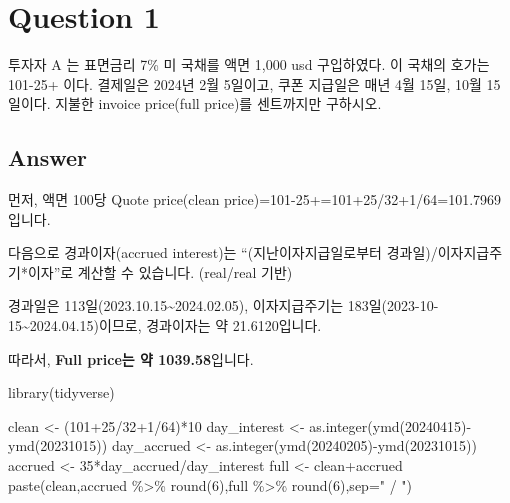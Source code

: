 \documentclass[
  letterpaper,
  DIV=11,
  numbers=noendperiod]{scrreprt}
\newenvironment{Shaded}{\begin{snugshade}}{\end{snugshade}}
\newcommand{\AttributeTok}[1]{\textcolor[rgb]{0.40,0.45,0.13}{#1}}
\newcommand{\DecValTok}[1]{\textcolor[rgb]{0.68,0.00,0.00}{#1}}
\newcommand{\FunctionTok}[1]{\textcolor[rgb]{0.28,0.35,0.67}{#1}}
\newcommand{\NormalTok}[1]{\textcolor[rgb]{0.00,0.23,0.31}{#1}}
\newcommand{\OtherTok}[1]{\textcolor[rgb]{0.00,0.23,0.31}{#1}}
\newcommand{\SpecialCharTok}[1]{\textcolor[rgb]{0.37,0.37,0.37}{#1}}
\newcommand{\StringTok}[1]{\textcolor[rgb]{0.13,0.47,0.30}{#1}}
\begin{document}

\section*{Question 1}\label{question-1}


투자자 A 는 표면금리 7\% 미 국채를 액면 1,000 usd 구입하였다. 이 국채의
호가는 101-25+ 이다. 결제일은 2024년 2월 5일이고, 쿠폰 지급일은 매년 4월
15일, 10월 15일이다. 지불한 invoice price(full price)를 센트까지만
구하시오.

\subsection*{Answer}\label{answer}

먼저, 액면 100당 Quote price(clean
price)=101-25+=101+25/32+1/64=101.7969입니다.

다음으로 경과이자(accrued interest)는 ``(지난이자지급일로부터
경과일)/이자지급주기*이자''로 계산할 수 있습니다. (real/real 기반)

경과일은 113일(2023.10.15\textasciitilde2024.02.05), 이자지급주기는
183일(2023-10-15\textasciitilde2024.04.15)이므로, 경과이자는 약
21.6120입니다.

따라서, \textbf{Full price는 약 1039.58}입니다.

\begin{Shaded}
\begin{Highlighting}[]
\FunctionTok{library}\NormalTok{(tidyverse)}
\end{Highlighting}
\end{Shaded}

\begin{Shaded}
\begin{Highlighting}[]
\NormalTok{clean }\OtherTok{\textless{}{-}}\NormalTok{ (}\DecValTok{101}\SpecialCharTok{+}\DecValTok{25}\SpecialCharTok{/}\DecValTok{32}\SpecialCharTok{+}\DecValTok{1}\SpecialCharTok{/}\DecValTok{64}\NormalTok{)}\SpecialCharTok{*}\DecValTok{10}
\NormalTok{day\_interest }\OtherTok{\textless{}{-}} \FunctionTok{as.integer}\NormalTok{(}\FunctionTok{ymd}\NormalTok{(}\DecValTok{20240415}\NormalTok{)}\SpecialCharTok{{-}}\FunctionTok{ymd}\NormalTok{(}\DecValTok{20231015}\NormalTok{))}
\NormalTok{day\_accrued }\OtherTok{\textless{}{-}} \FunctionTok{as.integer}\NormalTok{(}\FunctionTok{ymd}\NormalTok{(}\DecValTok{20240205}\NormalTok{)}\SpecialCharTok{{-}}\FunctionTok{ymd}\NormalTok{(}\DecValTok{20231015}\NormalTok{))}
\NormalTok{accrued }\OtherTok{\textless{}{-}} \DecValTok{35}\SpecialCharTok{*}\NormalTok{day\_accrued}\SpecialCharTok{/}\NormalTok{day\_interest}
\NormalTok{full }\OtherTok{\textless{}{-}}\NormalTok{ clean}\SpecialCharTok{+}\NormalTok{accrued}
\FunctionTok{paste}\NormalTok{(clean,accrued }\SpecialCharTok{\%\textgreater{}\%} \FunctionTok{round}\NormalTok{(}\DecValTok{6}\NormalTok{),full }\SpecialCharTok{\%\textgreater{}\%} \FunctionTok{round}\NormalTok{(}\DecValTok{6}\NormalTok{),}\AttributeTok{sep=}\StringTok{" / "}\NormalTok{)}
\end{Highlighting}
\end{Shaded}
\end{document}
